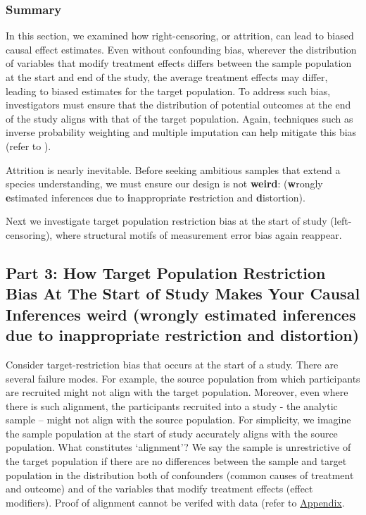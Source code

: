 \documentclass[
  single column]{article}
\begin{document}
\subsubsection{Summary}\label{summary-1}

In this section, we examined how right-censoring, or attrition, can lead
to biased causal effect estimates. Even without confounding bias,
wherever the distribution of variables that modify treatment effects
differs between the sample population at the start and end of the study,
the average treatment effects may differ, leading to biased estimates
for the target population. To address such bias, investigators must
ensure that the distribution of potential outcomes at the end of the
study aligns with that of the target population. Again, techniques such
as inverse probability weighting and multiple imputation can help
mitigate this bias (refer to
).

Attrition is nearly inevitable. Before seeking ambitious samples that
extend a species understanding, we must ensure our design is not
\textbf{weird}: (\textbf{w}rongly \textbf{e}stimated inferences due to
\textbf{i}nappropriate \textbf{r}estriction and \textbf{d}istortion).

Next we investigate target population restriction bias at the start of
study (left-censoring), where structural motifs of measurement error
bias again reappear.

\newpage{}

\subsection{\texorpdfstring{Part 3: How Target Population Restriction
Bias At The Start of Study Makes Your Causal Inferences weird
(\textbf{w}rongly \textbf{e}stimated inferences due to
\textbf{i}nappropriate \textbf{r}estriction and
\textbf{d}istortion)}{Part 3: How Target Population Restriction Bias At The Start of Study Makes Your Causal Inferences weird (wrongly estimated inferences due to inappropriate restriction and distortion)}}\label{id-sec-3}

Consider target-restriction bias that occurs at the start of a study.
There are several failure modes. For example, the source population from
which participants are recruited might not align with the target
population. Moreover, even where there is such alignment, the
participants recruited into a study - the analytic sample -- might not
align with the source population. For simplicity, we imagine the sample
population at the start of study accurately aligns with the source
population. What constitutes `alignment'? We say the sample is
unrestrictive of the target population if there are no differences
between the sample and target population in the distribution both of
confounders (common causes of treatment and outcome) and of the
variables that modify treatment effects (effect modifiers). Proof of
alignment cannot be verifed with data (refer to
\hyperref[id-app-c]{Appendix}.
\end{document}
